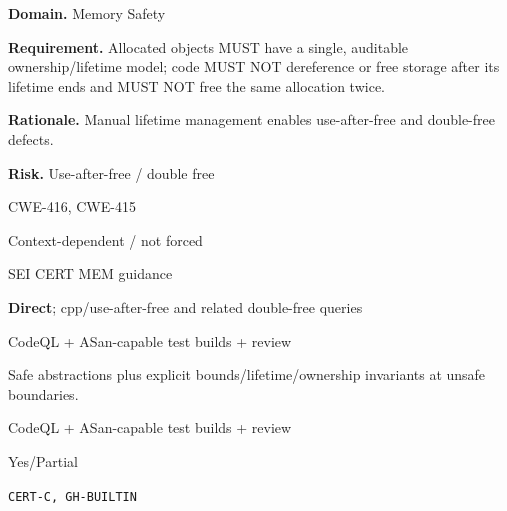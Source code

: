 \documentclass[10pt,letterpaper]{article}
\newcommand{\prioritybadge}[2]{\tcbox[on line,boxrule=0pt,arc=1.2mm,boxsep=0.7mm,left=1mm,right=1mm,top=0.4mm,bottom=0.4mm,colback=#2!12,coltext=#2]{\scriptsize\bfseries #1}}
\begin{document}
\begin{rulebox}[title={\texttt{SCS-C-MEM-002} \hfill \prioritybadge{Critical Control}{Critical}}]
\textbf{Domain.} Memory Safety

\textbf{Requirement.} Allocated objects MUST have a single, auditable ownership/lifetime model; code MUST NOT dereference or free storage after its lifetime ends and MUST NOT free the same allocation twice.

\textbf{Rationale.} Manual lifetime management enables use-after-free and double-free defects.

\textbf{Risk.} Use-after-free / double free

\begin{description}[leftmargin=2.65cm,labelwidth=2.3cm,style=nextline,itemsep=1pt,topsep=3pt]
  \item[CWE] CWE-416, CWE-415
  \item[OWASP] Context-dependent / not forced
  \item[CERT] SEI CERT MEM guidance
  \item[CodeQL] \textbf{Direct}; cpp/use-after-free and related double-free queries
  \item[Enforcement] CodeQL + ASan-capable test builds + review
  \item[Prevention] Safe abstractions plus explicit bounds/lifetime/ownership invariants at unsafe boundaries.
  \item[Verification] CodeQL + ASan-capable test builds + review
  \item[Automation] Yes/Partial
  \item[Sources] \texttt{CERT-C, GH-BUILTIN}
\end{description}
\end{rulebox}
\end{document}
